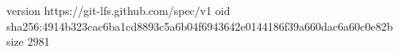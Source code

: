 version https://git-lfs.github.com/spec/v1
oid sha256:4914b323cac6ba1cd8893c5a6b04f6943642e0144186f39a660dac6a60c0e82b
size 2981
